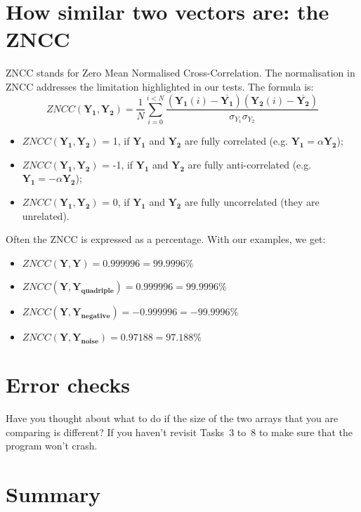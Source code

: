\documentclass[english,a4paper,12pt,oneside]{article}
\begin{document}
\section{How similar two vectors are: the ZNCC}

ZNCC stands for Zero Mean Normalised Cross-Correlation. 
The normalisation in ZNCC addresses the limitation highlighted in our tests. 
The formula is:
\begin{equation}
ZNCC(\mathbf{Y_1}, \mathbf{Y_2}) = \frac{1}{N}\sum^{i < N}_{i=0} \frac{(\mathbf{Y_1}(i)-\overline{\mathbf{Y_1}})(\mathbf{Y_2}(i)-\overline{\mathbf{Y_2}})}{\sigma_{Y_1}\sigma_{Y_2}}
\end{equation}
\begin{itemize}
\item $ZNCC(\mathbf{Y_1}, \mathbf{Y_2})$ = 1, if $\mathbf{Y_1}$ and $\mathbf{Y_2}$ are fully correlated (e.g. $\mathbf{Y_1} = \alpha \mathbf{Y_2}$);
\item $ZNCC(\mathbf{Y_1}, \mathbf{Y_2})$ = -1, if $\mathbf{Y_1}$ and $\mathbf{Y_2}$ are fully anti-correlated (e.g. $\mathbf{Y_1} = -\alpha \mathbf{Y_2}$);
\item $ZNCC(\mathbf{Y_1}, \mathbf{Y_2})$ = 0, if $\mathbf{Y_1}$ and $\mathbf{Y_2}$ are fully uncorrelated (they are unrelated).
\end{itemize}
Often the ZNCC is expressed as a percentage. 
With our examples, we get:
\begin{itemize}
\item $ZNCC(\mathbf{Y}, \mathbf{Y}) = 0.999996 =	99.9996\%$
\item $ZNCC(\mathbf{Y}, \mathbf{Y_{quadriple}}) = 0.999996 =	99.9996\%$
\item $ZNCC(\mathbf{Y}, \mathbf{Y_{negative}}) = -0.999996 =	-99.9996\%$
\item $ZNCC(\mathbf{Y}, \mathbf{Y_{noise}}) =  0.97188 =	97.188\%$
\end{itemize}

\section{Error checks}

Have you thought about what to do if the size of the two arrays that you are comparing is different?
If you haven't revisit Tasks~3 to~8 to make sure that the program won't crash.

\section{Summary}
\end{document}
